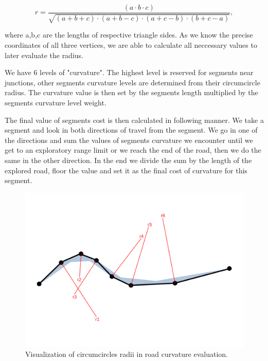 \documentclass[oneside]{article}
\begin{document}
        \begin{equation}
            r = \frac{(a\cdot b\cdot c)}{\sqrt{(a+b+c)\cdot(a+b-c)\cdot(a+c-b)\cdot(b+c-a)}},
            \label{eqn:circum_circle}
        \end{equation}

        \noindent where a,b,c are the lengths of respective triangle sides. As we know the precise coordinates of all three vertices, we are able to calculate all neccessary values to later evaluate the radius. 

        We have 6 levels of "curvature". The highest level is reserved for segments near junctions, other segments curvature levels are determined from their circumcircle radius. The curvature value is then set by the segments length multiplied by the segments curvature level weight.
        
        The final value of segments cost is then calculated in following manner. We take a segment and look in both directions of travel from the segment. We go in one of the directions and sum the values of segments curvature we encounter until we get to an exploratory range limit or we reach the end of the road, then we do the same in the other direction. In the end we divide the sum by the length of the explored road, floor the value and set it as the final cost of curvature for this segment.

        \begin{figure}[H]
            \centering
            \includegraphics[trim={0cm 3.5cm 0cm 2.7cm}, clip, width=\linewidth]{path_curvature.pdf}
            \caption{Visualization of circumcircles radii in road curvature evaluation.}
            \label{fig:curvature}
        \end{figure}
\end{document}
